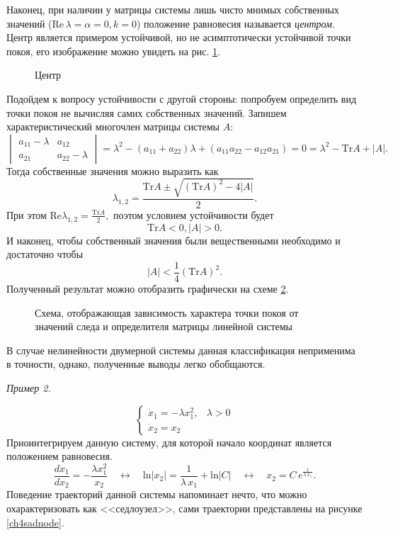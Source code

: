 \begin{itemize}
Наконец, при наличии у матрицы системы лишь чисто мнимых собственных значений ($\text{Re} \, \lambda = \alpha = 0, k =0$) положение равновесия называется \textit{центром}. Центр является примером устойчивой, но не асимптотически устойчивой точки покоя, его изображение можно увидеть на рис. \ref{ch4centre}.

\begin{figure}[h]
	\caption{Центр}\label{ch4centre}
	

\end{figure}


\end{itemize}

Подойдем к вопросу устойчивости с другой стороны: попробуем определить вид точки покоя не вычисляя самих собственных значений. Запишем характеристический многочлен матрицы системы $A$:
$$
\begin{vmatrix}
a_{11} - \lambda & a_12\\
a_{21} & a_{22} - \lambda
\end{vmatrix} = \lambda^2 - (a_{11} + a_{22}) \lambda + (a_{11} a_{22} - a_{12} a_{21}) = 0 = \lambda^2 - \text{Tr} A + |A|.
$$
Тогда собственные значения можно выразить как
$$
\lambda_{1,2} = \frac{\text{Tr} A \pm \sqrt{(\text{Tr} A)^2 - 4 |A|}}{2}.
$$
При этом $\text{Re}\lambda_{1,2} = \frac{\text{Tr} A}{2},$ поэтом условием устойчивости будет 
$$
\text{Tr} A < 0, |A| >0.
$$
И наконец, чтобы собственный значения были вещественными необходимо и достаточно чтобы
$$
|A| < \frac{1}{4} (\text{Tr} A)^2.
$$
Полученный результат можно отобразить графически на схеме \ref{ch4sc}.

\begin{figure}[h]
	\caption{Схема, отображающая зависимость характера точки покоя от значений следа и определителя матрицы линейной системы}\label{ch4sc}
	

\end{figure}

В случае нелинейности двумерной системы данная классификация неприменима в точности, однако, полученные выводы легко обобщаются. 

\textit{Пример 2.}

$$
\begin{cases}
\dot x_1 = -\lambda x_1^2, & \lambda >0 \\
\dot x_2 = x_2
\end{cases}
$$
Приоинтегрируем данную систему, для которой начало координат является положением равновесия.
$$
\frac{dx_1}{dx_2} = -\frac{\lambda x_1^2}{x_2}   \quad \longleftrightarrow \quad \text{ln} |x_2| = \frac{1}{\lambda \, x_1} + \text{ln} |C|   \quad \longleftrightarrow \quad x_2 = C \, e^{\frac{1}{\lambda \, x_1}}.
$$
Поведение траекторий данной системы напоминает нечто, что можно охарактеризовать как <<седлоузел>>, сами траектории представлены на рисунке \ref{ch4sadnode}.

